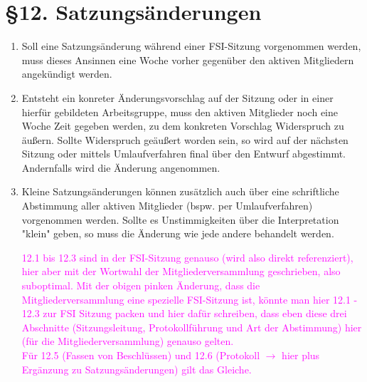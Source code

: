 \documentclass[a4paper,12pt]{article}
\begin{document}
\section*{§12. Satzungsänderungen}
\begin{enumerate}
	\item
		Soll eine Satzungsänderung während einer FSI-Sitzung
		vorgenommen werden, muss dieses Ansinnen eine Woche vorher
		gegenüber den aktiven Mitgliedern angekündigt werden.
	\item
		Entsteht ein konreter Änderungsvorschlag auf der Sitzung oder in
		einer hierfür gebildeten Arbeitsgruppe, muss den aktiven
		Mitglieder noch eine Woche Zeit gegeben werden, zu dem konkreten
		Vorschlag Widerspruch zu äußern.
		Sollte Widerspruch geäußert worden sein, so wird auf der
		nächsten Sitzung oder mittels Umlaufverfahren final über den
		Entwurf abgestimmt. Andernfalls wird die Änderung angenommen.
	\item
		Kleine Satzungsänderungen können zusätzlich
		auch über eine schriftliche Abstimmung aller
		aktiven Mitglieder (bspw. per Umlaufverfahren)
		vorgenommen werden. Sollte es Unstimmigkeiten über die
		Interpretation "klein" geben, so muss die Änderung wie jede
		andere behandelt werden.

\textcolor{magenta}{12.1 bis 12.3 sind in der FSI-Sitzung genauso (wird also direkt referenziert), hier aber mit der Wortwahl der Mitgliederversammlung geschrieben, also suboptimal. Mit der obigen pinken Änderung, dass die Mitgliederversammlung eine spezielle FSI-Sitzung ist, könnte man hier 12.1 - 12.3 zur FSI Sitzung packen und hier dafür schreiben, dass eben diese drei Abschnitte (Sitzungsleitung, Protokollführung und  Art der Abstimmung) hier (für die Mitgliederversammlung) genauso gelten. \\
Für 12.5 (Fassen von Beschlüssen) und 12.6 (Protokoll $\rightarrow$ hier plus Ergänzung zu Satzungsänderungen) gilt das Gleiche.}


\end{enumerate}
\end{document}
